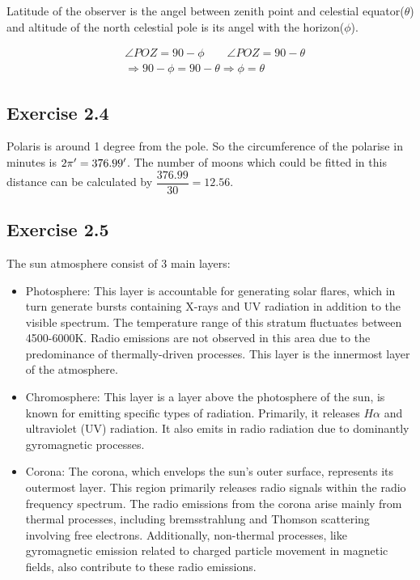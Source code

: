 \documentclass[12pt]{article}
\begin{document}
 Latitude of the observer is the angel between zenith point and celestial equator($\theta$) and altitude of the north celestial pole is its angel with the horizon($\phi$).

 \begin{align}
 &\angle POZ = 90 - \phi  \qquad \angle POZ = 90- \theta \\
 &\Rightarrow 90 - \phi = 90 - \theta \Rightarrow \phi = \theta
 \end{align}

 \subsection{Exercise 2.4}

 Polaris is around 1 degree from the pole\parencite{lecturenote}. So the circumference of the polarise in minutes is $2\pi \time 60^\prime = 376.99^\prime$. The number of moons which could be fitted in this distance can be calculated by $\dfrac{376.99}{30} = 12.56$.   

 \subsection{Exercise 2.5}

 The sun atmosphere consist of 3 main layers\parencite{Thesun}:
 \begin{itemize}
 \item Photosphere: This layer is accountable for generating solar flares, which in turn generate bursts containing X-rays and UV radiation in addition to the visible spectrum. The temperature range of this stratum fluctuates between 4500-6000K. Radio emissions are not observed in this area due to the predominance of thermally-driven processes. This layer is the innermost layer of the atmosphere.
 \item Chromosphere: This layer is a layer above the photosphere of the sun, is known for emitting specific types of radiation. Primarily, it releases $H\alpha$ and ultraviolet (UV) radiation. It also emits in radio
 radiation due to dominantly gyromagnetic processes. 
 \item Corona: The corona, which envelops the sun's outer surface, represents its outermost layer. This region primarily releases radio signals within the radio frequency spectrum. The radio emissions from the corona arise mainly from thermal processes, including bremsstrahlung and Thomson scattering involving free electrons. Additionally, non-thermal processes, like gyromagnetic emission related to charged particle movement in magnetic fields, also contribute to these radio emissions. 
 \end{itemize}
\end{document}
